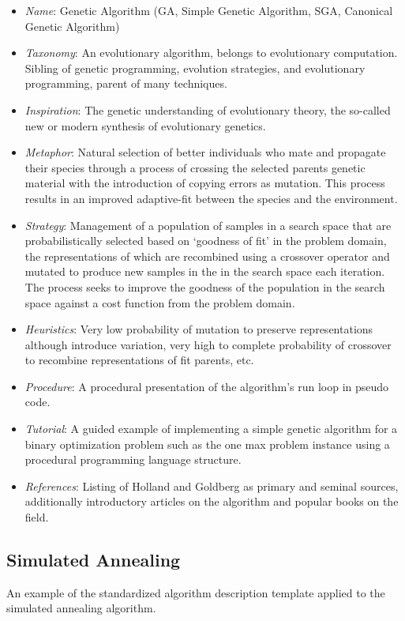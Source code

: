 \documentclass[a4paper, 11pt]{article}
\begin{document}
\begin{itemize}
	\item \emph{Name}: Genetic Algorithm (GA, Simple Genetic Algorithm, SGA, Canonical Genetic Algorithm)
	\item \emph{Taxonomy}: An evolutionary algorithm, belongs to evolutionary computation. Sibling of genetic programming, evolution strategies, and evolutionary programming, parent of many techniques.
	\item \emph{Inspiration}: The genetic understanding of evolutionary theory, the so-called new or modern synthesis of evolutionary genetics. 
	\item \emph{Metaphor}: Natural selection of better individuals who mate and propagate their species through a process of crossing the selected parents genetic material with the introduction of copying errors as mutation. This process results in an improved adaptive-fit between the species and the environment.
	\item \emph{Strategy}: Management of a population of samples in a search space that are probabilistically selected based on `goodness of fit' in the problem domain, the representations of which are recombined using a crossover operator and mutated to produce new samples in the in the search space each iteration. The process seeks to improve the goodness of the population in the search space against a cost function from the problem domain.
	\item \emph{Heuristics}: Very low probability of mutation to preserve representations although introduce variation, very high to complete probability of crossover to recombine representations of fit parents, etc.
	\item \emph{Procedure}: A procedural presentation of the algorithm's run loop in pseudo code.
	\item \emph{Tutorial}: A guided example of implementing a simple genetic algorithm for a binary optimization problem such as the one max problem instance using a procedural programming language structure.
	\item \emph{References}: Listing of Holland and Goldberg as primary and seminal sources, additionally introductory articles on the algorithm and popular books on the field.
\end{itemize}

\subsection{Simulated Annealing}
An example of the standardized algorithm description template applied to the simulated annealing algorithm.
\end{document}
